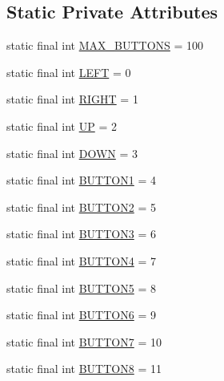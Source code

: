 \subsection*{Static Private Attributes}
\begin{DoxyCompactItemize}
\item 
static final int \mbox{\hyperlink{classorg_1_1newdawn_1_1slick_1_1_input_a2c2eabdc1cc7e21483aed750421861b1}{M\+A\+X\+\_\+\+B\+U\+T\+T\+O\+NS}} = 100
\item 
static final int \mbox{\hyperlink{classorg_1_1newdawn_1_1slick_1_1_input_ae8f7bd1fc3af0b5464783bf25c951f1d}{L\+E\+FT}} = 0
\item 
static final int \mbox{\hyperlink{classorg_1_1newdawn_1_1slick_1_1_input_a0020786269096a261588ebc09af33f95}{R\+I\+G\+HT}} = 1
\item 
static final int \mbox{\hyperlink{classorg_1_1newdawn_1_1slick_1_1_input_acca76c032ac2ba7a9e127c6d786530cb}{UP}} = 2
\item 
static final int \mbox{\hyperlink{classorg_1_1newdawn_1_1slick_1_1_input_a10f811d8a5cbb57c4912f5c5b1802f62}{D\+O\+WN}} = 3
\item 
static final int \mbox{\hyperlink{classorg_1_1newdawn_1_1slick_1_1_input_ae1ed38fe2059bd8915593514ceb75718}{B\+U\+T\+T\+O\+N1}} = 4
\item 
static final int \mbox{\hyperlink{classorg_1_1newdawn_1_1slick_1_1_input_ab26bf1bc4c119d2a7e4b7ea1a9cd8dad}{B\+U\+T\+T\+O\+N2}} = 5
\item 
static final int \mbox{\hyperlink{classorg_1_1newdawn_1_1slick_1_1_input_a430eb65040a5b52d39dd367a05d5e4a5}{B\+U\+T\+T\+O\+N3}} = 6
\item 
static final int \mbox{\hyperlink{classorg_1_1newdawn_1_1slick_1_1_input_a24a230fd107eccaf288e34c0de65fec1}{B\+U\+T\+T\+O\+N4}} = 7
\item 
static final int \mbox{\hyperlink{classorg_1_1newdawn_1_1slick_1_1_input_ad1677b59202e549bdf39954ea887ea2e}{B\+U\+T\+T\+O\+N5}} = 8
\item 
static final int \mbox{\hyperlink{classorg_1_1newdawn_1_1slick_1_1_input_a86c0a454e14ac06210ea3c50e90f2f11}{B\+U\+T\+T\+O\+N6}} = 9
\item 
static final int \mbox{\hyperlink{classorg_1_1newdawn_1_1slick_1_1_input_af2425a2022c39e8121fadb4f81e56499}{B\+U\+T\+T\+O\+N7}} = 10
\item 
static final int \mbox{\hyperlink{classorg_1_1newdawn_1_1slick_1_1_input_a5600a7e22a45fb846679e625f0d3b6bf}{B\+U\+T\+T\+O\+N8}} = 11
\item 

\end{DoxyCompactItemize}
